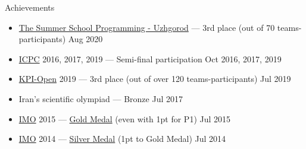 \begin{rSection}{Achievements}
  \begin{itemize}
    \itemsep -3pt
    \item \href{http://codeschool.uzhnu.edu.ua/en#}{The Summer School Programming - Uzhgorod} --- 3rd place (out of 70 teams-participants)
    \hfill Aug 2020
    \item \href{https://icpc.global/}{ICPC} 2016, 2017, 2019 --- Semi-final participation
    \hfill Oct 2016, 2017, 2019
    \item \href{https://open.kpi.ua/en}{KPI-Open} 2019 --- 3rd place (out of over 120 teams-participants)
    \hfill Jul 2019
    \item Iran's scientific olympiad --- Bronze
    \hfill Jul 2017
    \item \href{https://www.imo-official.org/}{IMO} 2015 --- \href{https://www.imo-official.org/participant_r.aspx?id=25121}{Gold Medal} (even with 1pt for P1)
    \hfill Jul 2015
    \item \href{https://www.imo-official.org/}{IMO} 2014 --- \href{https://www.imo-official.org/participant_r.aspx?id=25121}{Silver Medal} (1pt to Gold Medal)
    \hfill Jul 2014
  \end{itemize}
\end{rSection}
